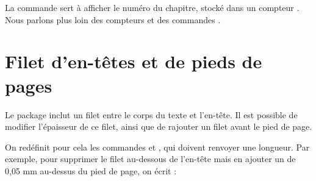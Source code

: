 \begin{plusloins}
La commande  sert à afficher le numéro du chapitre, stocké dans un compteur . Nous parlons plus loin des compteurs et des commandes .\label{apparencecompteur}
\end{plusloins}

\section{Filet d'en-têtes et de pieds de pages}

Le package  inclut un filet entre le corps du texte et l'en-tête. Il est possible de modifier l'épaisseur de ce filet, ainsi que de rajouter un filet avant le  pied de page.

On redéfinit pour cela les commandes  et , qui doivent renvoyer une longueur.
Par exemple, pour supprimer le filet au-dessous de l'en-tête mais en ajouter un de 0,05 mm au-dessus du pied de page, on écrit : 

\begin{latexcode}
\renewcommand{\headrulewidth}[0]{0pt}
\renewcommand{\footrulewidth}[0]{0.05mm}
\end{latexcode}
